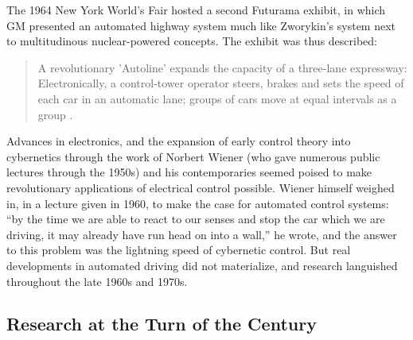 The 1964 New York World's Fair hosted a second Futurama exhibit, in
which GM presented an automated highway system much like Zworykin's
system next to multitudinous nuclear-powered concepts. The exhibit was
thus described: 
\begin{quote}
A revolutionary 'Autoline' expands the capacity of a three-lane
expressway: Electronically, a control-tower operator steers, brakes
and sets the speed of each car in an automatic lane; groups of cars
move at equal intervals as a group \cite{???}.
\end{quote}
 Advances in
electronics, and the expansion of early control theory into
cybernetics through the work of Norbert Wiener (who gave numerous
public lectures through the 1950s) and his contemporaries seemed
poised to make revolutionary applications of electrical control
possible. Wiener himself weighed in, in a lecture given in 1960, to
make the case for automated control systems: ``by the time we are able
to react to our senses and stop the car which we are driving, it may
already have run head on into a wall,'' he wrote, and the answer to
this problem was the lightning speed of cybernetic control.\cite{???} But real
developments in automated driving did not materialize, and research
languished throughout the late 1960s and 1970s.\cite{???}

\subsection{Research at the Turn of the Century}

